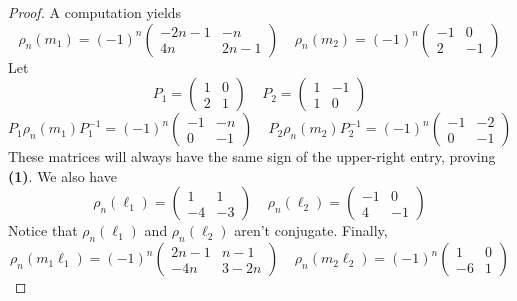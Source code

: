 \documentclass{article}
\theoremstyle{plain}
\theoremstyle{definition}
\theoremstyle{plain}
\theoremstyle{plain}
\theoremstyle{plain}
\theoremstyle{remark}
\theoremstyle{remark}
\theoremstyle{plain}
\theoremstyle{plain}
\begin{document}
\begin{proof}
A computation yields
\begin{equation}
	\rho_n(m_1) = (-1)^n\begin{pmatrix}-2n-1 & -n \\ 4n & 2n-1\end{pmatrix} \ \ \ \ \ \rho_n(m_2) = (-1)^n\begin{pmatrix}-1 & 0 \\ 2 & -1\end{pmatrix}
\end{equation}
Let 
\begin{equation}
	P_1 = \begin{pmatrix}1 & 0 \\ 2 & 1 \end{pmatrix} \ \ \ \ \ P_2 = \begin{pmatrix} 1 & -1 \\ 1 & 0 \end{pmatrix}
\end{equation}
\begin{equation}
	P_1\rho_n(m_1)P_1^{-1} = (-1)^n\begin{pmatrix}-1 & -n \\ 0 & -1\end{pmatrix} \ \ \ \ \ P_2\rho_n(m_2)P_2^{-1} = (-1)^n\begin{pmatrix}-1 & -2 \\ 0 & -1\end{pmatrix} 
\end{equation}
These matrices will always have the same sign of the upper-right entry, proving \textbf{(1)}. We also have 
\begin{equation}
	\rho_n(\ell_1) = \begin{pmatrix}1 & 1 \\ -4 & -3\end{pmatrix} \ \ \ \ \ \rho_n(\ell_2) = \begin{pmatrix}-1 & 0 \\ 4 & -1\end{pmatrix}
\end{equation}
Notice that $\rho_n(\ell_1)$ and $\rho_n(\ell_2)$ aren't conjugate. Finally,
\begin{equation}
	\rho_n(m_1\ell_1) = (-1)^n\begin{pmatrix}2n-1 & n-1 \\ -4n & 3-2n\end{pmatrix} \ \ \ \ \ \rho_n(m_2\ell_2) = (-1)^n\begin{pmatrix}1 & 0 \\ -6 & 1\end{pmatrix}

\end{equation}
\end{proof}
\end{document}

